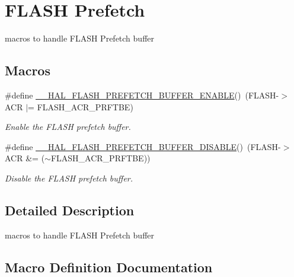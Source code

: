 \hypertarget{group___f_l_a_s_h___prefetch}{}\section{F\+L\+A\+SH Prefetch}
\label{group___f_l_a_s_h___prefetch}


macros to handle F\+L\+A\+SH Prefetch buffer  


\subsection*{Macros}
\begin{DoxyCompactItemize}
\item 
\#define \hyperlink{group___f_l_a_s_h___prefetch_gad36059641057f824516303ea92734e6f}{\+\_\+\+\_\+\+H\+A\+L\+\_\+\+F\+L\+A\+S\+H\+\_\+\+P\+R\+E\+F\+E\+T\+C\+H\+\_\+\+B\+U\+F\+F\+E\+R\+\_\+\+E\+N\+A\+B\+LE}()~(F\+L\+A\+SH-\/$>$A\+CR $\vert$= F\+L\+A\+S\+H\+\_\+\+A\+C\+R\+\_\+\+P\+R\+F\+T\+BE)
\begin{DoxyCompactList}\small\item\em Enable the F\+L\+A\+SH prefetch buffer. \end{DoxyCompactList}\item 
\#define \hyperlink{group___f_l_a_s_h___prefetch_ga646a4cb92e85659334d14a8c78f0ede8}{\+\_\+\+\_\+\+H\+A\+L\+\_\+\+F\+L\+A\+S\+H\+\_\+\+P\+R\+E\+F\+E\+T\+C\+H\+\_\+\+B\+U\+F\+F\+E\+R\+\_\+\+D\+I\+S\+A\+B\+LE}()~(F\+L\+A\+SH-\/$>$A\+CR \&= ($\sim$F\+L\+A\+S\+H\+\_\+\+A\+C\+R\+\_\+\+P\+R\+F\+T\+BE))
\begin{DoxyCompactList}\small\item\em Disable the F\+L\+A\+SH prefetch buffer. \end{DoxyCompactList}\end{DoxyCompactItemize}


\subsection{Detailed Description}
macros to handle F\+L\+A\+SH Prefetch buffer 



\subsection{Macro Definition Documentation}
\mbox{\label{group___f_l_a_s_h___prefetch_ga646a4cb92e85659334d14a8c78f0ede8}} 

